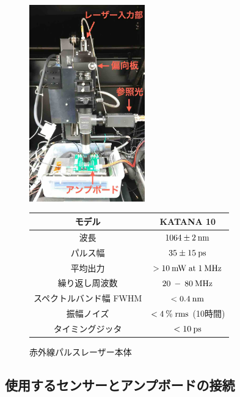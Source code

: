\begin{figure}[h]
    \begin{minipage}[c]{0.45\linewidth}
        \centering
        \includegraphics[width=5cm]{fig/ch4/Laser.jpg}
        \caption{赤外線パルスレーザー本体}
        \label{fg:Laser}
    \end{minipage}
    \begin{minipage}[c]{0.45\linewidth}
        \def\@captype{table}
        \centering
        \begin{tabular}{cc}
            \hline
            モデル & KATANA 10  \\ \hline \hline
            波長 & $1064 \pm 2\:\rm{nm}$  \\ 
            パルス幅 & $35 \pm 15\:\rm{ps}$  \\ 
            平均出力 & $>10\:\rm{mW}\;\rm{at}\;1\:\rm{MHz}$  \\ 
            繰り返し周波数 & $20\:-\:80\:\rm{MHz}$  \\ 
            スペクトルバンド幅 FWHM & $<0.4\:\rm{nm}$  \\ 
            振幅ノイズ & $<4\:\%\;\rm{rms}$  (10時間)\\ 
            タイミングジッタ & $<10\:\rm{ps}$  \\ \hline
        \end{tabular}
        \label{tab:Laser_performance}
    \end{minipage}
\end{figure}

\subsection{使用するセンサーとアンプボードの接続}

